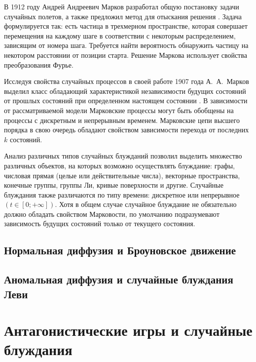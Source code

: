 В 1912 году Андрей Андреевич Марков разработал общую постановку задачи случайных полетов, а также предложил метод для отыскания решения \cite{markov_wahrscheinlichkeitsrechnung_1912}. Задача формулируется так: есть частица в трехмерном пространстве, которая совершает перемещения на каждому шаге в соответствии с некоторым распределением, зависящим от номера шага. Требуется найти вероятность обнаружить частицу на некотором расстоянии от позиции старта. Решение Маркова использует свойства преобразования Фурье.

Исследуя свойства случайных процессов в своей работе 1907 года А.~А.~Марков выделил класс обладающий характеристикой независимости будущих состояний от прошлых состояний при определенном настоящем состоянии \cite{shiryaev_2021}. В зависимости от рассматриваемой модели Марковские процессы могут быть обобщены на процессы с дискретным и непрерывным временем. Марковские цепи высшего порядка в свою очередь обладают свойством зависимости перехода от последних $k$ состояний.

Анализ различных типов случайных блужданий позволил выделить множество различных объектов, на которых возможно осуществлять блуждание: графы, числовая прямая (целые или действительные числа), векторные пространства, конечные группы, группы Ли, кривые поверхности и другие. Случайные блуждания также различаются по типу времени: дискретное или непрерывное $(t \in [0; +\infty])$. Хотя в общем случае случайное блуждание не обязательно должно обладать свойством Марковости, по умолчанию подразумевают зависимость будущих состояний только от текущего состояния.

\subsection{Нормальная диффузия и Броуновское движение}\label{subsec:ch1/sec2/sub1}
\subsection{Аномальная диффузия и случайные блуждания Леви}\label{subsec:ch1/sec2/sub2}

\section{Антагонистические игры и случайные блуждания}\label{sec:ch1/sec3}

